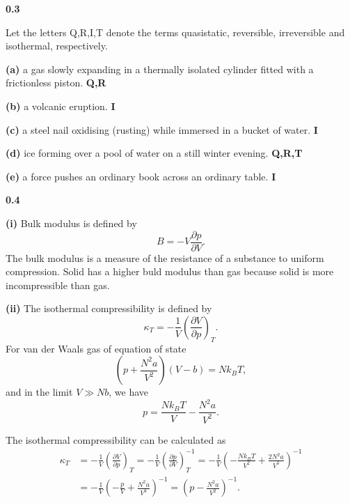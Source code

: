 \documentclass[12pt]{article}
\newcommand{\problem}[2]{%
    \par\vspace{1em}
    \noindent\textbf{#1\quad #2}
    \par\smallskip
}
\begin{document}
\smallbreak
\problem{0.3}{} Let the letters Q,R,I,T denote the terms quasistatic, reversible, irreversible and
isothermal, respectively.

\noindent\textbf{(a)} a gas slowly expanding in a thermally isolated cylinder fitted with a frictionless
piston. \textbf{Q,R}

\noindent\textbf{(b)} a volcanic eruption. \textbf{I}

\noindent\textbf{(c)} a steel nail oxidising (rusting) while immersed in a bucket of water. \textbf{I}

\noindent\textbf{(d)} ice forming over a pool of water on a still winter evening. \textbf{Q,R,T}

\noindent\textbf{(e)} a force pushes an ordinary book across an ordinary table. \textbf{I}


\smallbreak
\problem{0.4}{} 
\noindent\textbf{(i)} \qquad Bulk modulus is defined by
\begin{equation}
    B = -V \frac{\partial p}{\partial V}.
\end{equation}
The bulk modulus is a measure of the resistance of a substance to uniform compression. Solid has a higher buld modulus than gas because solid is more incompressible than gas.

\break

\noindent\textbf{(ii)} \qquad The isothermal compressibility is defined by
\begin{equation}
    \kappa_T = -\frac{1}{V}\left(\frac{\partial V}{\partial p}\right)_T.
\end{equation}
For van der Waals gas of equation of state
\begin{equation}
    \left(p + \frac{N^2a}{V^2}\right)(V-b) = Nk_BT,
\end{equation}
and in the limit $V \gg Nb$, we have
\begin{equation}
    p = \frac{Nk_BT}{V} - \frac{N^2a}{V^2}.
\end{equation}

The isothermal compressibility can be calculated as
\[
\begin{aligned}
    \kappa_T &= -\frac{1}{V}\left(\frac{\partial V}{\partial p}\right)_T
    = -\frac{1}{V}\left(\frac{\partial p}{\partial V}\right)_T^{-1}
    = -\frac{1}{V}\left(-\frac{Nk_BT}{V^2} + \frac{2N^2a}{V^3}\right)^{-1} \\
    & = -\frac{1}{V} \left(-\frac{p}{V} + \frac{N^2a}{V^3}\right)^{-1} = \left(p - \frac{N^2a}{V^2}\right)^{-1}.
\end{aligned}
\]
\end{document}

